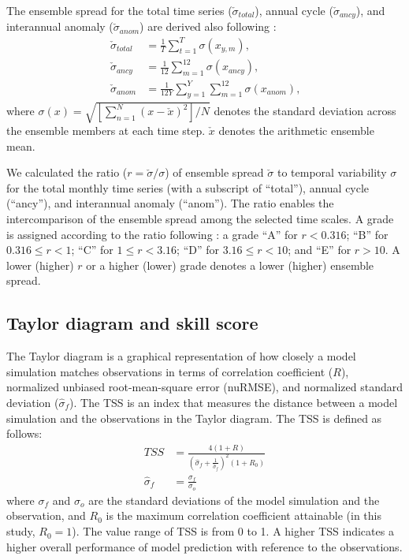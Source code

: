 \documentclass[essd, manuscript]{copernicus}
\begin{document}
The ensemble spread for the total time series (\(\check{\sigma}_{total}\)), annual cycle (\(\check{\sigma}_{ancy}\)), and interannual anomaly (\(\check{\sigma}_{anom}\)) are derived also following \citet{dirmeyer2006BAMS}:
\begin{align}
  \check{\sigma}_{total} & = \frac{1}{T} \sum_{t=1}^{T} \sigma(x_{y,m})
  \text{,} \\
  \check{\sigma}_{ancy}  & = \frac{1}{12} \sum_{m=1}^{12} \sigma(x_{ancy})
  \text{,} \\
  \check{\sigma}_{anom}  & = \frac{1}{12Y} \sum_{y=1}^{Y} \sum_{m=1}^{12} \sigma(x_{anom})
  \text{,}
\end{align}
where \(\sigma(x) = \sqrt{[\sum_{n=1}^{N}(x-\check{x})^2]/N}\) denotes the standard deviation across the ensemble members at each time step. \(\check{x}\) denotes the arithmetic ensemble mean.

We calculated the ratio (\(r=\check{\sigma}/\sigma\)) of ensemble spread \(\check{\sigma}\) to temporal variability \(\sigma\) for the total monthly time series (with a subscript of ``total''), annual cycle (``ancy''), and interannual anomaly (``anom''). The ratio enables the intercomparison of the ensemble spread among the selected time scales. A grade is assigned according to the ratio following \citet{dirmeyer2006BAMS}: a grade ``A'' for \(r < 0.316\); ``B'' for \(0.316 \le r < 1\); ``C'' for \(1 \le r < 3.16\); ``D'' for \(3.16 \le r < 10\); and ``E'' for \(r > 10\). A lower (higher) \(r\) or a higher (lower) grade denotes a lower (higher) ensemble spread.

\subsection{Taylor diagram and skill score}\label{sec:methods:taylor}

The Taylor diagram \citep{taylor2001JGRA} is a graphical representation of how closely a model simulation matches observations in terms of correlation coefficient (\(R\)), normalized unbiased root-mean-square error (nuRMSE), and normalized standard deviation (\(\hat{\sigma}_{f}\)). The TSS is an index that measures the distance between a model simulation and the observations in the Taylor diagram. The TSS is defined as follows:
\begin{align}
  TSS              & = \frac{4 (1 + R)}{(\hat{\sigma}_{f} + \frac{1}{\hat{\sigma}_{f}})^2 ( 1 + R_{0})} \\
  \hat{\sigma}_{f} & = \frac{\sigma_{f}}{\sigma_{o}}
\end{align}
where \(\sigma_{f}\) and \(\sigma_{o}\) are the standard deviations of the model simulation and the observation, and \(R_{0}\) is the maximum correlation coefficient attainable (in this study, \(R_{0} = 1\)). The value range of TSS is from 0 to 1. A higher TSS indicates a higher overall performance of model prediction with reference to the observations.
\end{document}
